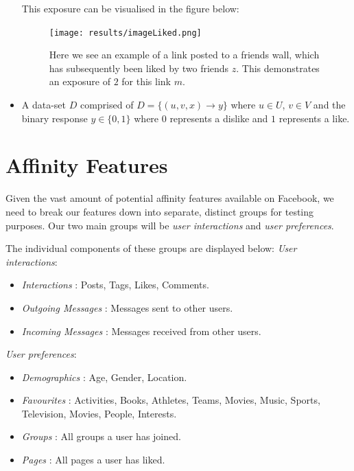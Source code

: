 \begin{itemize}
This exposure can be visualised in the figure below:

\begin{figure}[tbh!]
	\begin{center}
		\texttt{[image: results/imageLiked.png]}
		\caption{Here we see an example of a link posted to a friends wall, which has subsequently been liked by two friends $z$. This 
				 demonstrates an exposure of $2$ for this link $m$.}
	\end{center}
\end{figure}

\item A data-set $D$ comprised of $D = \{(u,v,x) \to y\}$ where $u \in U$, $v \in V$ and the binary response $y \in \{0,1\}$ 
where $0$ represents a dislike and $1$ represents a like. 
\end{itemize}

\section{Affinity Features}
\label{sec:features}

Given the vast amount of potential affinity features available on Facebook, we need to break our features down into separate, distinct 
groups for testing purposes. Our two main groups will be \emph{user interactions} and \emph{user preferences}.

The individual components of these groups are displayed below:
\emph{User interactions}:
\begin{itemize}
\item \emph{Interactions} : Posts, Tags, Likes, Comments.
\item \emph{Outgoing Messages} : Messages sent to other users.
\item \emph{Incoming Messages} : Messages received from other users.
\end{itemize}

\emph{User preferences}:
\begin{itemize}
\item \emph{Demographics} : Age, Gender, Location.
\item \emph{Favourites} : Activities, Books, Athletes, Teams, Movies, Music, Sports, Television, Movies, People, Interests.
\item \emph{Groups} : All groups a user has joined.
\item \emph{Pages} :  All pages a user has liked.
\end{itemize}

